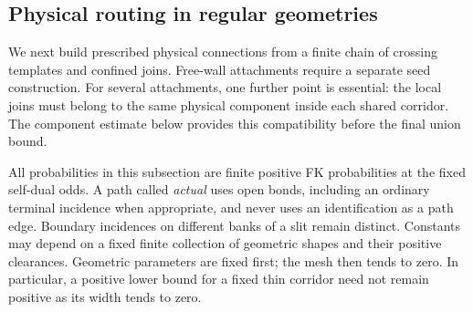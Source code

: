 

\subsection{Physical routing in regular geometries}

We next build prescribed physical connections from a finite chain of
crossing templates and confined joins. Free-wall attachments require
a separate seed construction. For several attachments, one further
point is essential: the local joins must belong to the same physical
component inside each shared corridor. The component estimate below
provides this compatibility before the final union bound.

All probabilities in this subsection are finite positive FK probabilities
at the fixed self-dual odds. A path called \emph{actual} uses open bonds,
including an ordinary terminal incidence when appropriate, and never
uses an identification as a path edge. Boundary incidences on different
banks of a slit remain distinct. Constants may depend on a fixed finite
collection of geometric shapes and their positive clearances. Geometric
parameters are fixed first; the mesh then tends to zero. In particular,
a positive lower bound for a fixed thin corridor need not remain positive
as its width tends to zero.

